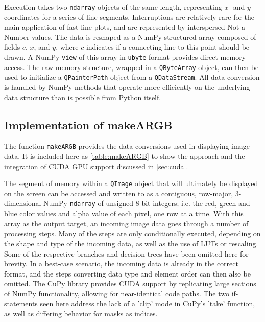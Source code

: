 Execution takes two \texttt{ndarray} objects of the same length, representing $x$- and $y$-coordinates for a series of line segments. Interruptions are relatively rare for the main application of fast line plots, and are represented by interspersed Not-a-Number values. The data is reshaped as a NumPy structured array composed of fields $c$, $x$, and $y$, where $c$ indicates if a connecting line to this point should be drawn. A NumPy \texttt{view} of this array in \texttt{ubyte} format provides direct memory access. The raw memory structure, wrapped in a \texttt{QByteArray} object, can then be used to initialize a \texttt{QPainterPath} object from a \texttt{QDataStream}. All data conversion is handled by NumPy methods that operate more efficiently on the underlying data structure than is possible from Python itself.

\subsection{Implementation of makeARGB}
\label{app_makeARGB}

The function \texttt{makeARGB} provides the data conversions used in displaying image data. It is included here as \autoref{table:makeARGB} to show the approach and the integration of CUDA GPU support discussed in \autoref{sec:cuda}.

The segment of memory within a \texttt{QImage} object that will ultimately be displayed on the screen can be accessed and written to as a contiguous, row-major, 3-dimensional NumPy \texttt{ndarray} of unsigned 8-bit integers; i.e. the red, green and blue color values and alpha value of each pixel, one row at a time. With this array as the output target, an incoming image data goes through a number of processing steps. Many of the steps are only conditionally executed, depending on the shape and type of the incoming data, as well as the use of LUTs or rescaling. Some of the respective branches and decision trees have been omitted here for brevity. In a best-case scenario, the incoming data is already in the correct format, and the steps converting data type and element order can then also  be omitted. The CuPy library provides CUDA support by replicating large sections of NumPy functionality, allowing for near-identical code paths. The two if-statements seen here address the lack of a 'clip' mode in CuPy's 'take' function, as well as differing behavior for masks as indices.
